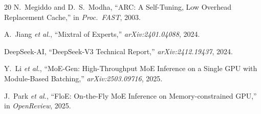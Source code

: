 \documentclass[11pt]{article}
\begin{document}
\begin{thebibliography}{20}
N.~Megiddo and D.~S.~Modha, ``ARC: A Self-Tuning, Low Overhead Replacement Cache,'' in \emph{Proc.\ FAST}, 2003.

A.~Jiang \emph{et al.}, ``Mixtral of Experts,'' \emph{arXiv:2401.04088}, 2024.

DeepSeek-AI, ``DeepSeek-V3 Technical Report,'' \emph{arXiv:2412.19437}, 2024.

Y.~Li \emph{et al.}, ``MoE-Gen: High-Throughput MoE Inference on a Single GPU with Module-Based Batching,'' \emph{arXiv:2503.09716}, 2025.

J.~Park \emph{et al.}, ``FloE: On-the-Fly MoE Inference on Memory-constrained GPU,'' in \emph{OpenReview}, 2025.

\end{thebibliography}
\end{document}
